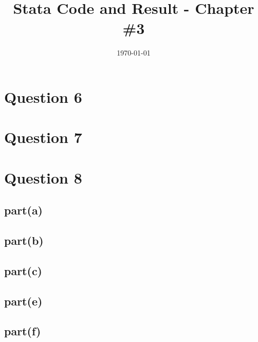 \documentclass[a4paper]{article}
\begin{document}
\title{Stata Code and Result - Chapter \#3}
\author{ }
\date{\today}
\maketitle

\section*{Question 6}

\begin{stlog}\end{stlog}



\section*{Question 7}
\begin{stlog}\end{stlog}



\section*{Question 8}
\subsection*{part(a)}
\begin{stlog}\end{stlog}
\subsection*{part(b)}
\begin{stlog}\end{stlog}
\subsection*{part(c)}
\begin{stlog}\end{stlog}
\subsection*{part(e)}
\begin{stlog}\end{stlog}
\subsection*{part(f)}
\begin{stlog}\end{stlog}
\end{document}
